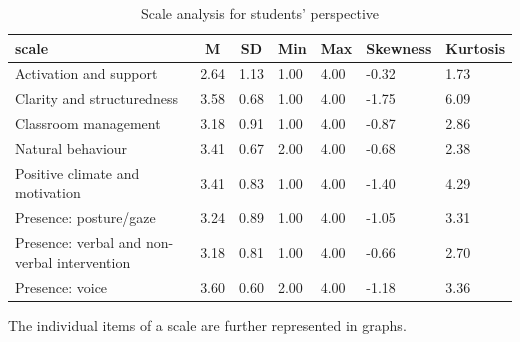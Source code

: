 \documentclass[
  english,
  man,floatsintext]{apa6}
\begin{document}
\begin{table}[h]

\begin{center}
\begin{threeparttable}

\caption{\label{tab:table-all-scales-students}Scale analysis for students' perspective}

\small{

\begin{tabular}{lllllll}
\toprule
scale & \multicolumn{1}{c}{M} & \multicolumn{1}{c}{SD} & \multicolumn{1}{c}{Min} & \multicolumn{1}{c}{Max} & \multicolumn{1}{c}{Skewness} & \multicolumn{1}{c}{Kurtosis}\\
\midrule
Activation and support & 2.64 & 1.13 & 1.00 & 4.00 & -0.32 & 1.73\\
Clarity and structuredness & 3.58 & 0.68 & 1.00 & 4.00 & -1.75 & 6.09\\
Classroom management & 3.18 & 0.91 & 1.00 & 4.00 & -0.87 & 2.86\\
Natural behaviour & 3.41 & 0.67 & 2.00 & 4.00 & -0.68 & 2.38\\
Positive climate and motivation & 3.41 & 0.83 & 1.00 & 4.00 & -1.40 & 4.29\\
Presence: posture/gaze & 3.24 & 0.89 & 1.00 & 4.00 & -1.05 & 3.31\\
Presence: verbal and non-verbal intervention & 3.18 & 0.81 & 1.00 & 4.00 & -0.66 & 2.70\\
Presence: voice & 3.60 & 0.60 & 2.00 & 4.00 & -1.18 & 3.36\\
\bottomrule
\end{tabular}

}

\end{threeparttable}
\end{center}

\end{table}

\newpage

The individual items of a scale are further represented in graphs.
\end{document}
